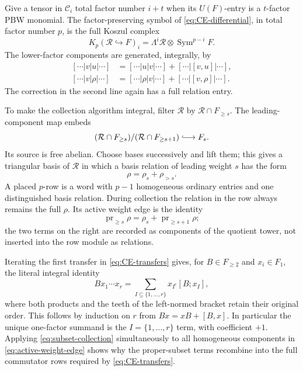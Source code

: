 \documentclass[11pt]{amsart}
\theoremstyle{remark}
\newcommand{\Sym}{\operatorname{Sym}}
\newcommand{\Rel}{\mathcal R}
\newcommand{\pr}{\operatorname{pr}}
\begin{document}
Give a tensor in $\mathcal C_i$ total factor number $i+t$ when its
$U(F)$-entry is a $t$-factor PBW monomial.  The factor-preserving symbol
of \eqref{eq:CE-differential}, in total factor number $p$, is the full
Koszul complex
\begin{equation}\label{eq:CE-Koszul-symbol}
 K_p(\Rel\hookrightarrow F)_i
 =\Lambda^i\Rel\otimes\Sym^{p-i}F.                    
\end{equation}
The lower-factor components are generated, integrally, by
\begin{equation}\label{eq:CE-transfers}
 \begin{split}
 [\cdots|v|u|\cdots]
  &=[\cdots|u|v|\cdots]+[\cdots|[v,u]|\cdots],\\
 [\cdots|v|\rho|\cdots]
  &=[\cdots|\rho|v|\cdots]+[\cdots|[v,\rho]|\cdots].
 \end{split}
\end{equation}
The correction in the second line again has a full relation entry.

To make the collection algorithm integral, filter $\Rel$ by
$\Rel\cap F_{\geq s}$.  The leading-component map embeds
\[
 (\Rel\cap F_{\geq s})/(\Rel\cap F_{\geq s+1})
 \lhook\joinrel\longrightarrow F_s.
\]
Its source is free abelian.  Choose bases successively and lift them;
this gives a triangular basis of $\Rel$ in which a basis relation of
leading weight $s$ has the form
\begin{equation}\label{eq:triangular-relation}
                         \rho=\rho_s+\rho_{>s}.
\end{equation}
A placed $p$-row is a word with $p-1$ homogeneous ordinary entries and
one distinguished basis relation.  During collection the relation in
the row always remains the full $\rho$.  Its active weight edge is the
identity
\begin{equation}\label{eq:active-weight-edge}
 \pr_{\geq s}\rho=\rho_s+\pr_{\geq s+1}\rho;
\end{equation}
the two terms on the right are recorded as components of the quotient
tower, not inserted into the row module as relations.

Iterating the first transfer in \eqref{eq:CE-transfers} gives, for
$B\in F_{\geq2}$ and $x_i\in F_1$, the literal integral identity
\begin{equation}\label{eq:subset-collection}
 Bx_1\cdots x_r
 =\sum_{I\subseteq\{1,\ldots,r\}}
   x_{I^c}[B;x_I],
\end{equation}
where both products and the teeth of the left-normed bracket retain
their original order.  This follows by induction on $r$ from
$Bx=xB+[B,x]$.  In particular the unique one-factor summand is the
$I=\{1,\ldots,r\}$ term, with coefficient $+1$.  Applying
\eqref{eq:subset-collection} simultaneously to all homogeneous
components in \eqref{eq:active-weight-edge} shows why the proper-subset
terms recombine into the full commutator rows required by
\eqref{eq:CE-transfers}.
\end{document}
